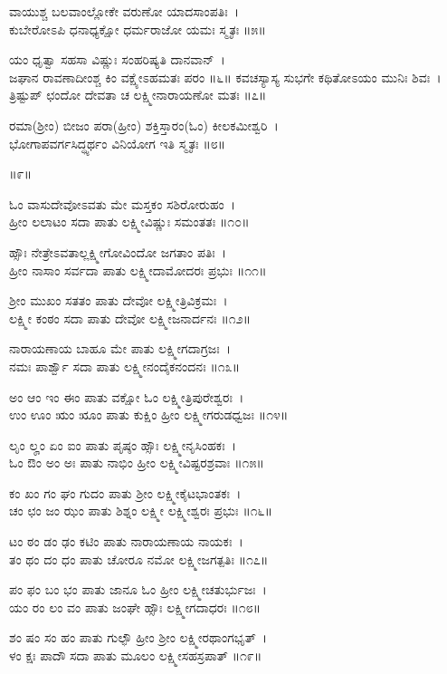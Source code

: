 ವಾಯುಶ್ಚ ಬಲವಾಂಲ್ಲೋಕೇ ವರುಣೋ ಯಾದಸಾಂಪತಿಃ~।\\
ಕುಬೇರೋಽಪಿ ಧನಾಧ್ಯಕ್ಷೋ ಧರ್ಮರಾಜೋ ಯಮಃ ಸ್ಮೃತಃ ॥೫॥

ಯಂ ಧೃತ್ವಾ ಸಹಸಾ ವಿಷ್ಣುಃ ಸಂಹರಿಷ್ಯತಿ ದಾನವಾನ್~।\\
ಜಘಾನ ರಾವಣಾದೀಂಶ್ಚ ಕಿಂ ವಕ್ಷ್ಯೇಽಹಮತಃ ಪರಂ ॥೬॥
\newpage
ಕವಚಸ್ಯಾಸ್ಯ ಸುಭಗೇ ಕಥಿತೋಽಯಂ ಮುನಿಃ ಶಿವಃ~।\\
ತ್ರಿಷ್ಟುಪ್ ಛಂದೋ ದೇವತಾ ಚ ಲಕ್ಷ್ಮೀನಾರಾಯಣೋ ಮತಃ ॥೭॥

ರಮಾ(ಶ್ರೀಂ) ಬೀಜಂ ಪರಾ(ಹ್ರೀಂ) ಶಕ್ತಿಸ್ತಾರಂ(ಓಂ) ಕೀಲಕಮೀಶ್ವರಿ~।\\
ಭೋಗಾಪವರ್ಗಸಿದ್ಧ್ಯರ್ಥಂ ವಿನಿಯೋಗ ಇತಿ ಸ್ಮೃತಃ ॥೮॥

॥೯॥

ಓಂ ವಾಸುದೇವೋಽವತು ಮೇ ಮಸ್ತಕಂ ಸಶಿರೋರುಹಂ~।\\
ಹ್ರೀಂ ಲಲಾಟಂ ಸದಾ ಪಾತು ಲಕ್ಷ್ಮೀವಿಷ್ಣುಃ ಸಮಂತತಃ ॥೧೦॥

ಹ್ಸೌಃ ನೇತ್ರೇಽವತಾಲ್ಲಕ್ಷ್ಮೀಗೋವಿಂದೋ ಜಗತಾಂ ಪತಿಃ~।\\
ಹ್ರೀಂ ನಾಸಾಂ ಸರ್ವದಾ ಪಾತು ಲಕ್ಷ್ಮೀದಾಮೋದರಃ ಪ್ರಭುಃ ॥೧೧॥

ಶ್ರೀಂ ಮುಖಂ ಸತತಂ ಪಾತು ದೇವೋ ಲಕ್ಷ್ಮೀತ್ರಿವಿಕ್ರಮಃ~।\\
ಲಕ್ಷ್ಮೀ ಕಂಠಂ ಸದಾ ಪಾತು ದೇವೋ ಲಕ್ಷ್ಮೀಜನಾರ್ದನಃ ॥೧೨॥

ನಾರಾಯಣಾಯ ಬಾಹೂ ಮೇ ಪಾತು ಲಕ್ಷ್ಮೀಗದಾಗ್ರಜಃ~।\\
ನಮಃ ಪಾರ್ಶ್ವೌ ಸದಾ ಪಾತು ಲಕ್ಷ್ಮೀನಂದೈಕನಂದನಃ ॥೧೩॥

ಅಂ ಆಂ ಇಂ ಈಂ ಪಾತು ವಕ್ಷೋ ಓಂ ಲಕ್ಷ್ಮೀತ್ರಿಪುರೇಶ್ವರಃ~।\\
ಉಂ ಊಂ ಋಂ ೠಂ ಪಾತು ಕುಕ್ಷಿಂ ಹ್ರೀಂ ಲಕ್ಷ್ಮೀಗರುಡಧ್ವಜಃ ॥೧೪॥

ಲೃಂ ಲೄಂ ಏಂ ಐಂ ಪಾತು ಪೃಷ್ಠಂ ಹ್ಸೌಃ ಲಕ್ಷ್ಮೀನೃಸಿಂಹಕಃ~।\\
ಓಂ ಔಂ ಅಂ ಅಃ ಪಾತು ನಾಭಿಂ ಹ್ರೀಂ ಲಕ್ಷ್ಮೀವಿಷ್ಟರಶ್ರವಾಃ ॥೧೫॥

ಕಂ ಖಂ ಗಂ ಘಂ ಗುದಂ ಪಾತು ಶ್ರೀಂ ಲಕ್ಷ್ಮೀಕೈಟಭಾಂತಕಃ~।\\
ಚಂ ಛಂ ಜಂ ಝಂ ಪಾತು ಶಿಶ್ನಂ ಲಕ್ಷ್ಮೀ ಲಕ್ಷ್ಮೀಶ್ವರಃ ಪ್ರಭುಃ ॥೧೬॥

ಟಂ ಠಂ ಡಂ ಢಂ ಕಟಿಂ ಪಾತು ನಾರಾಯಣಾಯ ನಾಯಕಃ~।\\
ತಂ ಥಂ ದಂ ಧಂ ಪಾತು ಚೋರೂ ನಮೋ ಲಕ್ಷ್ಮೀಜಗತ್ಪತಿಃ ॥೧೭॥

ಪಂ ಫಂ ಬಂ ಭಂ ಪಾತು ಜಾನೂ ಓಂ ಹ್ರೀಂ ಲಕ್ಷ್ಮೀಚತುರ್ಭುಜಃ~।\\
ಯಂ ರಂ ಲಂ ವಂ ಪಾತು ಜಂಘೇ ಹ್ಸೌಃ ಲಕ್ಷ್ಮೀಗದಾಧರಃ ॥೧೮॥

ಶಂ ಷಂ ಸಂ ಹಂ ಪಾತು ಗುಲ್ಫೌ ಹ್ರೀಂ ಶ್ರೀಂ ಲಕ್ಷ್ಮೀರಥಾಂಗಭೃತ್~।\\
ಳಂ ಕ್ಷಃ ಪಾದೌ ಸದಾ ಪಾತು ಮೂಲಂ ಲಕ್ಷ್ಮೀಸಹಸ್ರಪಾತ್ ॥೧೯॥

